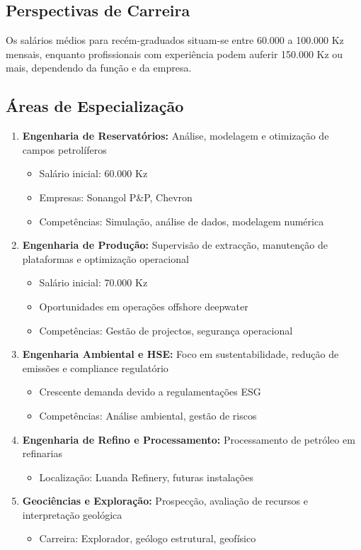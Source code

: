 \documentclass[12pt]{article}
\begin{document}
\subsection{Perspectivas de Carreira}

Os salários médios para recém-graduados situam-se entre 60.000 a 100.000 Kz mensais, enquanto profissionais com experiência podem auferir 150.000 Kz ou mais, dependendo da função e da empresa.

\subsection{Áreas de Especialização}

\begin{enumerate}
    \item \textbf{Engenharia de Reservatórios:} Análise, modelagem e otimização de campos petrolíferos
    \begin{itemize}
        \item Salário inicial: 60.000 Kz
        \item Empresas: Sonangol P\&P, Chevron
        \item Competências: Simulação, análise de dados, modelagem numérica
    \end{itemize}

    \item \textbf{Engenharia de Produção:} Supervisão de extracção, manutenção de plataformas e optimização operacional
    \begin{itemize}
        \item Salário inicial: 70.000 Kz
        \item Oportunidades em operações offshore deepwater
        \item Competências: Gestão de projectos, segurança operacional
    \end{itemize}

    \item \textbf{Engenharia Ambiental e HSE:} Foco em sustentabilidade, redução de emissões e compliance regulatório
    \begin{itemize}
        \item Crescente demanda devido a regulamentações ESG
        \item Competências: Análise ambiental, gestão de riscos
    \end{itemize}

    \item \textbf{Engenharia de Refino e Processamento:} Processamento de petróleo em refinarias
    \begin{itemize}
        \item Localização: Luanda Refinery, futuras instalações
    \end{itemize}

    \item \textbf{Geociências e Exploração:} Prospecção, avaliação de recursos e interpretação geológica
    \begin{itemize}
        \item Carreira: Explorador, geólogo estrutural, geofísico
    \end{itemize}
\end{enumerate}
\end{document}
